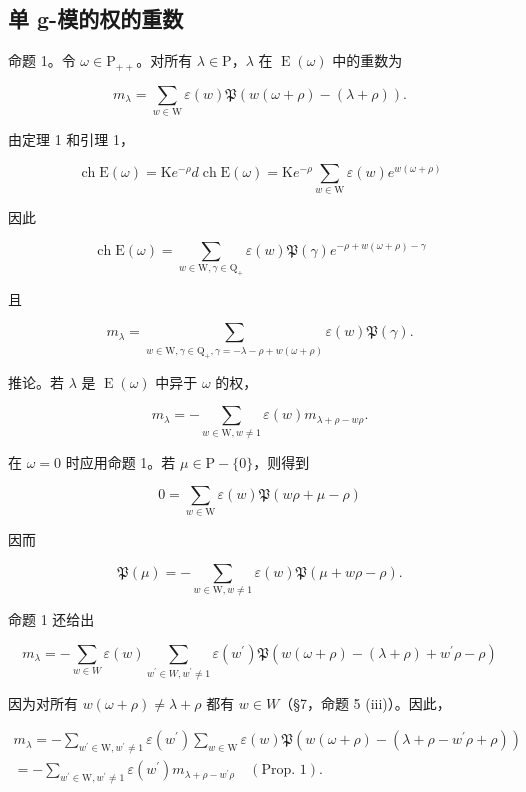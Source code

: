 \subsection{单 g-模的权的重数}

命题 1。令 \(\omega \in \mathrm{P}_{++}\)。对所有 \(\lambda \in \mathrm{P}\)，\(\lambda\) 在 \(\operatorname{E}(\omega)\) 中的重数为

\[
m _ {\lambda} = \sum_ {w \in \mathrm{W}} \varepsilon (w) \mathfrak {P} (w (\omega + \rho) - (\lambda + \rho)).
\]

由定理 1 和引理 1，

\[
\operatorname{ch} \mathrm{E} (\omega) = \mathrm{K} e ^ {- \rho} d \operatorname{ch} \mathrm{E} (\omega) = \mathrm{K} e ^ {- \rho} \sum_ {w \in \mathrm{W}} \varepsilon (w) e ^ {w (\omega + \rho)}
\]

因此

\[
\operatorname{ch} \mathrm{E} (\omega) = \sum_ {w \in \mathrm{W}, \gamma \in \mathrm{Q} _ {+}} \varepsilon (w) \mathfrak {P} (\gamma) e ^ {- \rho + w (\omega + \rho) - \gamma}
\]

且

\[
m _ {\lambda} = \sum_ {w \in \mathrm{W}, \gamma \in \mathrm{Q} _ {+}, \gamma = - \lambda - \rho + w (\omega + \rho)} \varepsilon (w) \mathfrak {P} (\gamma).
\]

推论。若 \(\lambda\) 是 \(\operatorname{E}(\omega)\) 中异于 \(\omega\) 的权，

\[
m _ {\lambda} = - \sum_ {w \in \mathrm{W}, w \neq 1} \varepsilon (w) m _ {\lambda + \rho - w \rho}.
\]

在 \(\omega = 0\) 时应用命题 1。若 \(\mu \in \mathrm{P} - \{0\}\)，则得到

\[
0 = \sum_ {w \in \mathrm{W}} \varepsilon (w) \mathfrak {P} (w \rho + \mu - \rho)
\]

因而

\[
\mathfrak {P} (\mu) = - \sum_ {w \in \mathrm{W}, w \neq 1} \varepsilon (w) \mathfrak {P} (\mu + w \rho - \rho).\tag{1}
\]

命题 1 还给出

\[
m _ {\lambda} = - \sum_ {w \in W} \varepsilon (w) \sum_ {w ^ {\prime} \in W, w ^ {\prime} \neq 1} \varepsilon (w ^ {\prime}) \mathfrak {P} (w (\omega + \rho) - (\lambda + \rho) + w ^ {\prime} \rho - \rho)
\]

因为对所有 \(w(\omega + \rho) \neq \lambda + \rho\) 都有 \(w \in W\)（§7，命题 5 (iii)）。因此，

\[
\begin{array}{l} m _ {\lambda} = - \sum_ {w ^ {\prime} \in \mathrm{W}, w ^ {\prime} \neq 1} \varepsilon (w ^ {\prime}) \sum_ {w \in \mathrm{W}} \varepsilon (w) \mathfrak {P} (w (\omega + \rho) - (\lambda + \rho - w ^ {\prime} \rho + \rho)) \\ = - \sum_ {w ^ {\prime} \in \mathrm{W}, w ^ {\prime} \neq 1} \varepsilon (w ^ {\prime}) m _ {\lambda + \rho - w ^ {\prime} \rho} \quad (\text {Prop. 1}). \end{array}
\]

